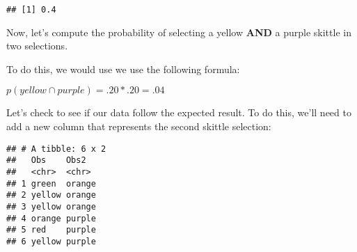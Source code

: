 \documentclass[
]{article}
\newenvironment{Shaded}{\begin{snugshade}}{\end{snugshade}}
\newcommand{\AttributeTok}[1]{\textcolor[rgb]{0.13,0.29,0.53}{#1}}
\newcommand{\DecValTok}[1]{\textcolor[rgb]{0.00,0.00,0.81}{#1}}
\newcommand{\FunctionTok}[1]{\textcolor[rgb]{0.13,0.29,0.53}{\textbf{#1}}}
\newcommand{\NormalTok}[1]{#1}
\newcommand{\OtherTok}[1]{\textcolor[rgb]{0.56,0.35,0.01}{#1}}
\newcommand{\SpecialCharTok}[1]{\textcolor[rgb]{0.81,0.36,0.00}{\textbf{#1}}}
\begin{document}
\begin{Shaded}
\end{Shaded}

\begin{verbatim}
## [1] 0.4
\end{verbatim}

Now, let's compute the probability of selecting a yellow \textbf{AND} a
purple skittle in two selections.

To do this, we would use we use the following formula:

\(p(yellow\cap purple)=.20*.20 =.04\)

Let's check to see if our data follow the expected result. To do this,
we'll need to add a new column that represents the second skittle
selection:

\begin{Shaded}
\end{Shaded}

\begin{verbatim}
## # A tibble: 6 x 2
##   Obs    Obs2  
##   <chr>  <chr> 
## 1 green  orange
## 2 yellow orange
## 3 yellow orange
## 4 orange purple
## 5 red    purple
## 6 yellow purple
\end{verbatim}
\end{document}
